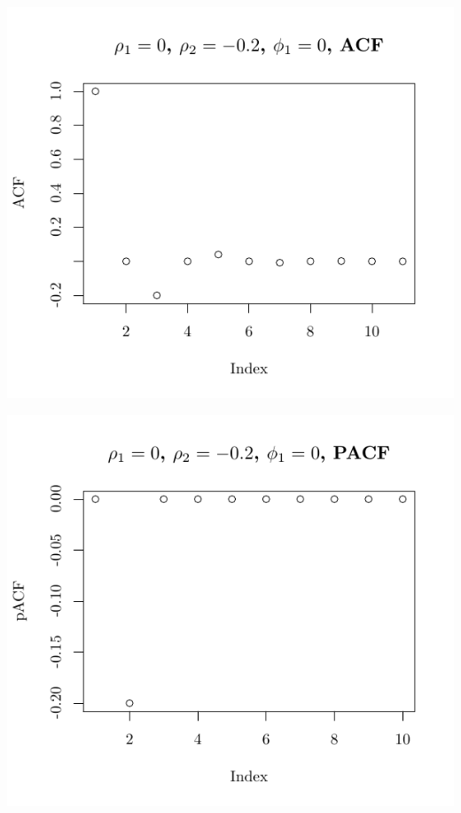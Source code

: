 \documentclass[10pt]{paper}\usepackage[]{graphicx}\usepackage[]{color}
\makeatletter
\def\maxwidth{ %
  \ifdim\Gin@nat@width>\linewidth
    \linewidth
  \else
    \Gin@nat@width
  \fi
}
\newenvironment{knitrout}{}{} %
\makeatother
\begin{document}
\begin{knitrout}
{\centering \includegraphics[width=\maxwidth]{figure/graphics-plotter-43} 

}




{\centering \includegraphics[width=\maxwidth]{figure/graphics-plotter-44} 

}





\end{knitrout}
\end{document}
